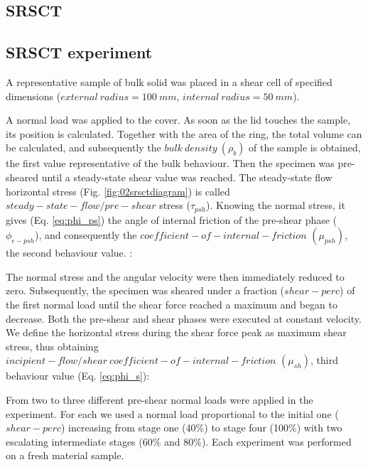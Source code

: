 \begin{appendix}

\section{SRSCT}
\label{sec:srsct}

\subsection{SRSCT experiment}
\label{subsec:srsctexperiment}
A representative sample of bulk solid was placed in a shear cell of specified dimensions ($external ~ radius = 100 ~ mm$, $internal ~ radius = 50 ~ mm$). 

A normal load was applied to the cover. As soon as the lid touches the sample, its position is calculated. Together with the area of the ring, the total volume can be calculated, and subsequently the $bulk ~ density ~ (\rho_b)$ of the sample is obtained, the first value representative of the bulk behaviour. Then the specimen was pre-sheared until a steady-state shear value was reached. The steady-state flow horizontal stress (Fig. \ref{fig:02srsctdiagram}) is called $steady-state-flow/pre-shear$ stress ($\tau_{psh}$). Knowing the normal stress, it gives (Eq. \ref{eq:phi_ps}) the angle of internal friction of the pre-shear phase ($\phi_{e-psh}$), and consequently the $coefficient-of-internal-friction $ $ (\mu_{psh})$, the second behaviour value. \cite{RefWorks:118}:


   

The normal stress and the angular velocity were then immediately reduced to zero. 
Subsequently, the specimen was sheared under a fraction ($shear-perc$) of the first normal load until the shear force reached a maximum and began to decrease. 
Both the pre-shear and shear phases were executed at constant velocity. We define the horizontal stress during the shear force peak as maximum shear stress, thus obtaining $incipient-flow/shear ~ coefficient-of-internal-friction $ $ (\mu_{sh})$, third behaviour value (Eq. \ref{eq:phi_s})\cite{RefWorks:118}:


 
From two to three different pre-shear normal loads were applied in the experiment. For each we used a normal load proportional to the initial one ($shear-perc$) increasing from stage one (40\%) to stage four (100\%) with two escalating intermediate stages (60\% and 80\%).
Each experiment was performed on a fresh material sample. \\


\end{appendix}
